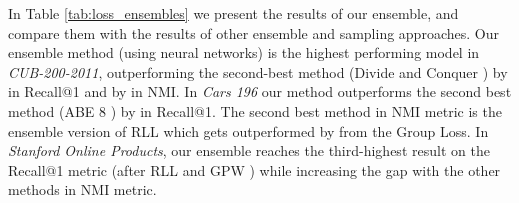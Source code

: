 \documentclass[runningheads]{llncs}
\begin{document}
 In Table \ref{tab:loss_ensembles} we present the results of our ensemble, and compare them with the results of other ensemble and sampling approaches. Our ensemble method (using  neural networks) is the highest performing model in \textit{CUB-200-2011}, outperforming the second-best method (Divide and Conquer \cite{DDBLP:conf/cvpr/Sanakoyeu2019}) by  in Recall@1 and by  in NMI. In \textit{Cars 196} our method outperforms the second best method (ABE 8 \cite{DBLP:conf/eccv/KimGCLK18}) by  in Recall@1. The second best method in NMI metric is the ensemble version of RLL \cite{DBLP:conf/cvpr/WangHKHGR19} which gets outperformed by  from the Group Loss. In \textit{Stanford Online Products}, our ensemble reaches the third-highest result on the Recall@1 metric (after RLL \cite{DBLP:conf/cvpr/WangHKHGR19} and GPW \cite{DDBLP:conf/cvpr/Wand2019}) while increasing the gap with the other methods in NMI metric.
\end{document}
